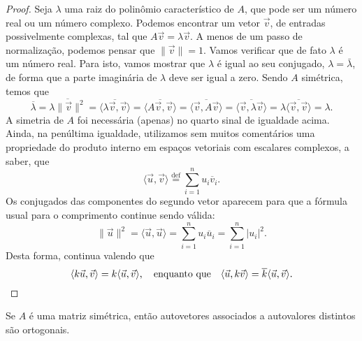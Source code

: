 \documentclass[../livro.tex]{subfiles}
\begin{document}
\begin{proof}
	Seja $\lambda$ uma raiz do polinômio característico de $A$, que pode ser um número real ou um número complexo. Podemos encontrar um vetor $\vec{v}$, de entradas possivelmente complexas, tal que $A\vec{v} = \lambda \vec{v}$. A menos de um passo de normalização, podemos pensar que $\|\vec{v}\| = 1$. Vamos verificar que de fato $\lambda$ é um número real. Para isto, vamos mostrar que $\lambda$ é igual ao seu conjugado, $\lambda = \bar{\lambda}$, de forma que a parte imaginária de $\lambda$ deve ser igual a zero. Sendo $A$ simétrica, temos que
	\begin{equation}
	\overline{\lambda} = \overline{\lambda \|\vec{v}\|^2} = \overline{\langle \lambda \vec{v}, \vec{v} \rangle} = \overline{\langle A \vec{v}, \vec{v} \rangle} = \overline{\langle \vec{v}, A \vec{v} \rangle} = \overline{\langle \vec{v}, \lambda \vec{v} \rangle} = \lambda \overline{\langle \vec{v}, \vec{v} \rangle} = \lambda.
	\end{equation} A simetria de $A$ foi necessária (apenas) no quarto sinal de igualdade acima. Ainda, na penúltima igualdade, utilizamos sem muitos comentários uma propriedade do produto interno em espaços vetoriais com escalares complexos, a saber, que
	\begin{equation}
	\langle\vec{u}, \vec{v}\rangle \stackrel{\text{def}}{=} \sum_{i=1}^{n} u_i \overline{v}_i.
	\end{equation} Os conjugados das componentes do segundo vetor aparecem para que a fórmula usual para o comprimento continue sendo válida:
	\begin{equation}
	\| \vec{u} \|^2 = \langle\vec{u}, \vec{u}\rangle = \sum_{i=1}^{n} u_i \overline{u}_i = \sum_{i=1}^{n} |u_i|^2.
	\end{equation} Desta forma, continua valendo que
	\begin{equation}
	\langle k\vec{u}, \vec{v} \rangle = k \langle \vec{u}, \vec{v}\rangle, \quad \text{enquanto que} \quad \langle \vec{u},k\vec{v}\rangle = \overline{k} \langle \vec{u}, \vec{v}\rangle. \qedhere
	\end{equation}
\end{proof}

\begin{proposition}\label{ortog}
	Se $A$ é uma matriz simétrica, então autovetores associados a autovalores distintos são ortogonais.
\end{proposition}
\end{document}
